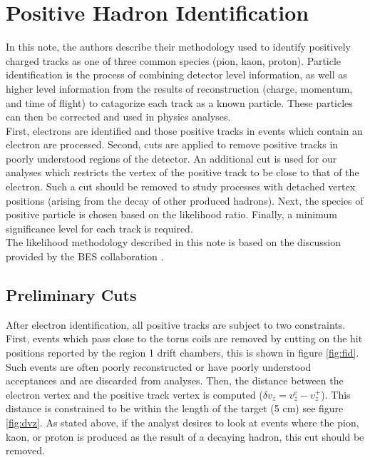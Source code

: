 \section{Positive Hadron Identification}


In this note, the authors describe their methodology used to identify positively charged tracks as one of three common species (pion, kaon, proton).  Particle identification is the process of combining detector level information, as well as higher level information from the results of reconstruction (charge, momentum, and time of flight) to catagorize each track as a known particle.  These particles can then be corrected and used in physics analyses. \\

First, electrons are identified and those positive tracks in events which contain an electron are processed.  Second, cuts are applied to remove positive tracks in poorly understood regions of the detector.  An additional cut is used for our analyses which restricts the vertex of the positive track to be close to that of the electron.  Such a cut should be removed to study processes with detached vertex positions (arising from the decay of other produced hadrons). Next, the species of positive particle is chosen based on the likelihood ratio.  Finally, a minimum significance level for each track is required.  \\

The likelihood methodology described in this note is based on the discussion provided by the BES collaboration \cite{bes_physics}.  

\subsection{Preliminary Cuts}


After electron identification, all positive tracks are subject to two constraints.  First, events which pass close to the torus coils are removed by cutting on the hit positions reported by the region 1 drift chambers, this is shown in figure \ref{fig:fid}.  Such events are often poorly reconstructed or have poorly understood acceptances and are discarded from analyses.  Then, the distance between the electron vertex and the positive track vertex is computed ($\delta v_{z} = v_{z}^{e} - v_{z}^{+}$).  This distance is constrained to be within the length of the target (5 cm) see figure \ref{fig:dvz}.  As stated above, if the analyst desires to look at events where the pion, kaon, or proton is produced as the result of a decaying hadron, this cut should be removed.  

